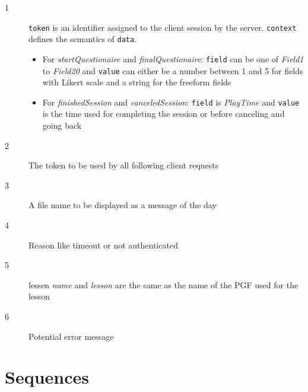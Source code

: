 \documentclass{scrartcl}
\begin{document}
\begin{description}
\item[{\footnotesize 1}] \texttt{token} is an identifier assigned to the client session by the server. \texttt{context} defines the semantics of \texttt{data}.

  \begin{itemize}
  \item For \emph{startQuestionaire} and \emph{finalQuestionaire}: \texttt{field} can be one of \emph{Field1} to \emph{Field20} and \texttt{value} can either be a number between 1 and 5 for fields with Likert scale and a string for the freeform fields
  \item For \emph{finishedSession} and \emph{canceledSession}: \texttt{field} is \emph{PlayTime} and \texttt{value} is the time used for completing the session or before canceling and going back
  \end{itemize}
\item[{\footnotesize 2}] The token to be used by all following client requests
\item[{\footnotesize 3}] A file name to be displayed as a message of the day
\item[{\footnotesize 4}] Reason like timeout or not authenticated
\item[{\footnotesize 5}] lessen \emph{name} and \emph{lesson} are the same as the name of the PGF used for the lesson
\item[{\footnotesize 6}] Potential error message
\end{description}
\section{Sequences}

  
  
  
\end{document}
